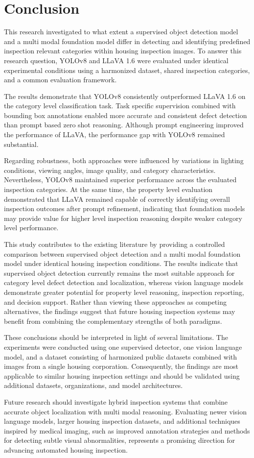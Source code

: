 \section{Conclusion}
\label{sec:conclusion}

This research investigated to what extent a supervised object detection model and a multi modal foundation model differ in detecting and identifying predefined inspection relevant categories within housing inspection images. To answer this research question, YOLOv8 and LLaVA 1.6 were evaluated under identical experimental conditions using a harmonized dataset, shared inspection categories, and a common evaluation framework.

The results demonstrate that YOLOv8 consistently outperformed LLaVA 1.6 on the category level classification task. Task specific supervision combined with bounding box annotations enabled more accurate and consistent defect detection than prompt based zero shot reasoning. Although prompt engineering improved the performance of LLaVA, the performance gap with YOLOv8 remained substantial.

Regarding robustness, both approaches were influenced by variations in lighting conditions, viewing angles, image quality, and category characteristics. Nevertheless, YOLOv8 maintained superior performance across the evaluated inspection categories. At the same time, the property level evaluation demonstrated that LLaVA remained capable of correctly identifying overall inspection outcomes after prompt refinement, indicating that foundation models may provide value for higher level inspection reasoning despite weaker category level performance.

This study contributes to the existing literature by providing a controlled comparison between supervised object detection and a multi modal foundation model under identical housing inspection conditions. The results indicate that supervised object detection currently remains the most suitable approach for category level defect detection and localization, whereas vision language models demonstrate greater potential for property level reasoning, inspection reporting, and decision support. Rather than viewing these approaches as competing alternatives, the findings suggest that future housing inspection systems may benefit from combining the complementary strengths of both paradigms.

These conclusions should be interpreted in light of several limitations. The experiments were conducted using one supervised detector, one vision language model, and a dataset consisting of harmonized public datasets combined with images from a single housing corporation. Consequently, the findings are most applicable to similar housing inspection settings and should be validated using additional datasets, organizations, and model architectures.

Future research should investigate hybrid inspection systems that combine accurate object localization with multi modal reasoning. Evaluating newer vision language models, larger housing inspection datasets, and additional techniques inspired by medical imaging, such as improved annotation strategies and methods for detecting subtle visual abnormalities, represents a promising direction for advancing automated housing inspection.